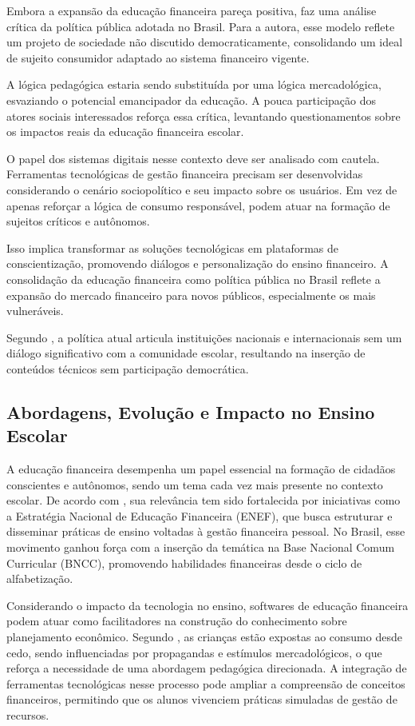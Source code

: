 \documentclass[
	article,			%
	12pt,				%
	oneside,			%
	a4paper,			%
	english,			%
	brazil,				%
	sumario=tradicional
	]{abntex2}
\begin{document}
    Embora a expansão da educação financeira pareça positiva,  faz uma análise crítica da política pública adotada no Brasil. Para a autora, esse modelo reflete um projeto de sociedade não discutido democraticamente, consolidando um ideal de sujeito consumidor adaptado ao sistema financeiro vigente.

    A lógica pedagógica estaria sendo substituída por uma lógica mercadológica, esvaziando o potencial emancipador da educação. A pouca participação dos atores sociais interessados reforça essa crítica, levantando questionamentos sobre os impactos reais da educação financeira escolar.

    O papel dos sistemas digitais nesse contexto deve ser analisado com cautela. Ferramentas tecnológicas de gestão financeira precisam ser desenvolvidas considerando o cenário sociopolítico e seu impacto sobre os usuários. Em vez de apenas reforçar a lógica de consumo responsável, podem atuar na formação de sujeitos críticos e autônomos.

    Isso implica transformar as soluções tecnológicas em plataformas de conscientização, promovendo diálogos e personalização do ensino financeiro. A consolidação da educação financeira como política pública no Brasil reflete a expansão do mercado financeiro para novos públicos, especialmente os mais vulneráveis.

    Segundo , a política atual articula instituições nacionais e internacionais sem um diálogo significativo com a comunidade escolar, resultando na inserção de conteúdos técnicos sem participação democrática.

\subsection{Abordagens, Evolução e Impacto no Ensino Escolar}
    A educação financeira desempenha um papel essencial na formação de cidadãos conscientes e autônomos, sendo um tema cada vez mais presente no contexto escolar. De acordo com , sua relevância tem sido fortalecida por iniciativas como a Estratégia Nacional de Educação Financeira (ENEF), que busca estruturar e disseminar práticas de ensino voltadas à gestão financeira pessoal. No Brasil, esse movimento ganhou força com a inserção da temática na Base Nacional Comum Curricular (BNCC), promovendo habilidades financeiras desde o ciclo de alfabetização.

    Considerando o impacto da tecnologia no ensino, softwares de educação financeira podem atuar como facilitadores na construção do conhecimento sobre planejamento econômico. Segundo , as crianças estão expostas ao consumo desde cedo, sendo influenciadas por propagandas e estímulos mercadológicos, o que reforça a necessidade de uma abordagem pedagógica direcionada. A integração de ferramentas tecnológicas nesse processo pode ampliar a compreensão de conceitos financeiros, permitindo que os alunos vivenciem práticas simuladas de gestão de recursos.
\end{document}
